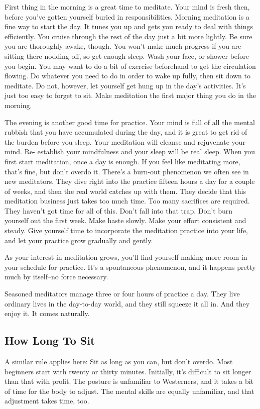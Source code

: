 First thing in the morning is a great time to meditate. Your mind is fresh then,
before you've gotten yourself buried in responsibilities. Morning meditation is
a fine way to start the day. It tunes you up and gets you ready to deal with
things efficiently. You cruise through the rest of the day just a bit more
lightly. Be sure you are thoroughly awake, though. You won't make much progress
if you are sitting there nodding off, so get enough sleep. Wash your face, or
shower before you begin. You may want to do a bit of exercise beforehand to get
the circulation flowing. Do whatever you need to do in order to wake up fully,
then sit down to meditate. Do not, however, let yourself get hung up in the
day's activities. It's just too easy to forget to sit. Make meditation the first
major thing you do in the morning.

The evening is another good time for practice. Your mind is full of all the
mental rubbish that you have accumulated during the day, and it is great to get
rid of the burden before you sleep. Your meditation will cleanse and rejuvenate
your mind. Re- establish your mindfulness and your sleep will be real sleep.
When you first start meditation, once a day is enough. If you feel like
meditating more, that's fine, but don't overdo it. There's a burn-out phenomenon
we often see in new meditators. They dive right into the practice fifteen hours
a day for a couple of weeks, and then the real world catches up with them. They
decide that this meditation business just takes too much time. Too many
sacrifices are required. They haven't got time for all of this. Don't fall into
that trap. Don't burn yourself out the first week. Make haste slowly. Make your
effort consistent and steady. Give yourself time to incorporate the meditation
practice into your life, and let your practice grow gradually and gently.

As your interest in meditation grows, you'll find yourself making more room in
your schedule for practice. It's a spontaneous phenomenon, and it happens pretty
much by itself--no force necessary.

Seasoned meditators manage three or four hours of practice a day. They live
ordinary lives in the day-to-day world, and they still squeeze it all in. And
they enjoy it. It comes naturally.

\subsection*{How Long To Sit}
A similar rule applies here: Sit as long as you can, but don't
overdo. Most beginners start with twenty or thirty minutes. Initially, it's
difficult to sit longer than that with profit. The posture is unfamiliar to
Westerners, and it takes a bit of time for the body to adjust. The mental skills
are equally unfamiliar, and that adjustment takes time, too.

